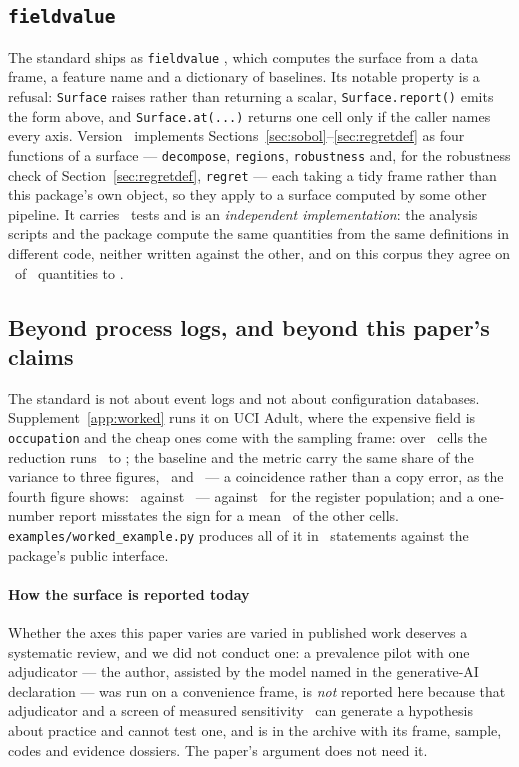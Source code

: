 \subsection{\texttt{fieldvalue}}
\label{sec:tool}

The standard ships as \texttt{fieldvalue} \citep{fieldvalue}, which computes the surface from a
data frame, a feature name and a dictionary of baselines. Its notable
property is a refusal: \texttt{Surface} raises rather than returning a
scalar, \texttt{Surface.report()} emits the form above, and
\texttt{Surface.at(...)} returns one cell only if the caller names every
axis. Version \fvVersion\ implements
Sections~\ref{sec:sobol}--\ref{sec:regretdef} as four functions of a surface
--- \texttt{decompose}, \texttt{regions}, \texttt{robustness} and, for the
robustness check of Section~\ref{sec:regretdef}, \texttt{regret} --- each
taking a tidy frame rather than this package's own object, so they
apply to a surface computed by some other pipeline. It carries \nTests\ tests
and is an \emph{independent implementation}: the analysis scripts and the
package compute the same quantities from the same definitions in different
code, neither written against the other, and on this corpus they agree on
\nAgreeQuantities\ of \nAgreeQuantities\ quantities to \agreeTolerance.

\subsection{Beyond process logs, and beyond this paper's claims}
\label{sec:worked}

The standard is not about event logs and not about configuration databases.
Supplement~\ref{app:worked} runs it on UCI Adult, where the expensive field is
\texttt{occupation} and the cheap ones come with the sampling frame: over
\exCells\ cells the reduction runs \exRmin\ to \exRmax; the baseline and the
metric carry the same share of the variance to three figures,
\exSbaselinePct\ and \exSmetricPct\ --- a coincidence rather than a copy
error, as the fourth figure shows: \exSbaselineFine\ against \exSmetricFine\
--- against \exSpopulationPct\ for the
register population; and a one-number report misstates the sign for a mean
\exMisreportPct\ of the other cells. \texttt{examples/worked\_example.py}
produces all of it in \exampleLines\ statements against the package's public
interface.

\paragraph{How the surface is reported today}
\label{sec:practice}
Whether the axes this paper varies are varied in published work deserves a
systematic review, and we did not conduct one: a prevalence pilot with one
adjudicator --- the author, assisted by the model named in the generative-AI
declaration --- was run on a convenience frame, is \emph{not} reported here
because that adjudicator and a screen of measured sensitivity \auditSens\ can
generate a hypothesis about practice and cannot test one, and is in the archive with its
frame, sample, codes and evidence dossiers. The paper's argument does not need
it.
